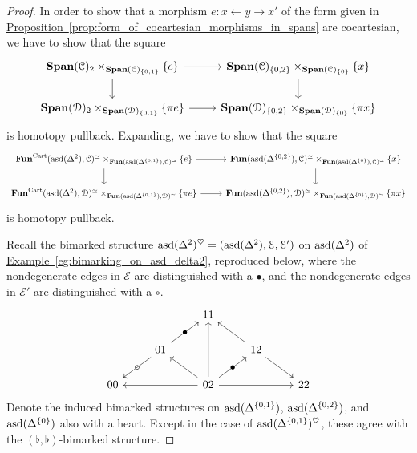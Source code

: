 \documentclass[main.tex]{subfiles}
\begin{document}
\begin{proof}
  In order to show that a morphism $e\colon x \leftarrow y \rightarrow x'$ of the form given in \hyperref[prop:form_of_cocartesian_morphisms_in_spans]{Proposition~\ref*{prop:form_of_cocartesian_morphisms_in_spans}} are cocartesian, we have to show that the square
  \begin{equation*}
    \begin{tikzcd}
      \Span(\category{C})_{2} \times_{\Span(\category{C})_{\{0, 1\}}} \{e\}
      \arrow[r]
      \arrow[d]
      & \Span(\category{C})_{\{0, 2\}} \times_{\Span(\category{C})_{\{0\}}} \{x\}
      \arrow[d]
      \\
      \Span(\category{D})_{2} \times_{\Span(\category{D})_{\{0, 1\}}} \{\pi e\}
      \arrow[r]
      & \Span(\category{D})_{\{0, 2\}} \times_{\Span(\category{D})_{\{0\}}} \{\pi x\}
    \end{tikzcd}
  \end{equation*}
  is homotopy pullback. Expanding, we have to show that the square
  \begin{equation*}
    \begin{tikzcd}
      \Fun^{\Cart}(\asd(\Delta^{2}), \category{C})^{\simeq} \times_{\Fun(\asd(\Delta^{\{0, 1\}}), \category{C})^{\simeq}} \{e\}
      \arrow[r]
      \arrow[d]
      & \Fun(\asd(\Delta^{\{0, 2\}}), \category{C})^{\simeq} \times_{\Fun(\asd(\Delta^{\{0\}}), \category{C})^{\simeq}} \{x\}
      \arrow[d]
      \\
      \Fun^{\Cart}(\asd(\Delta^{2}), \category{D})^{\simeq} \times_{\Fun(\asd(\Delta^{\{0, 1\}}), \category{D})^{\simeq}} \{\pi e\}
      \arrow[r]
      & \Fun(\asd(\Delta^{\{0, 2\}}), \category{D})^{\simeq} \times_{\Fun(\asd(\Delta^{\{0\}}), \category{D})^{\simeq}} \{\pi x\}
    \end{tikzcd}
  \end{equation*}
  is homotopy pullback.

  Recall the bimarked structure $\mathrm{asd}(\Delta^{2})^{\heartsuit} = (\mathrm{asd}(\Delta^{2}), \mathcal{E}, \mathcal{E}')$ on $\mathrm{asd}(\Delta^{2})$ of \hyperref[eg:bimarking_on_asd_delta2]{Example~\ref*{eg:bimarking_on_asd_delta2}}, reproduced below, where the nondegenerate edges in $\mathcal{E}$ are distinguished with a $\bullet$, and the nondegenerate edges in $\mathcal{E}'$ are distinguished with a $\circ$.
  \begin{equation*}
    \begin{tikzcd}
      && 11
      \\
      & 01
      \arrow[ur, "\bullet" marking]
      \arrow[dl, "\circ" marking]
      && 12
      \arrow[ul]
      \arrow[dr]
      \\
      00
      && 02
      \arrow[ll]
      \arrow[rr]
      \arrow[uu]
      \arrow[ur, "\bullet" marking]
      \arrow[ul]
      && 22
    \end{tikzcd}
  \end{equation*}
  Denote the induced bimarked structures on $\mathrm{asd}(\Delta^{\{0, 1\}})$, $\mathrm{asd}(\Delta^{\{0, 2\}})$, and $\mathrm{asd}(\Delta^{\{0\}})$ also with a heart. Except in the case of $\mathrm{asd}(\Delta^{\{0, 1\}})^{\heartsuit}$, these agree with the $(\flat, \flat)$-bimarked structure.


\end{proof}
\end{document}
